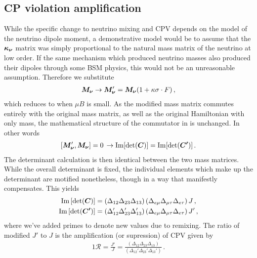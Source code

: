 \subsection{CP violation amplification}\label{sec:amp}
\noindent While the specific change to neutrino mixing and CPV depends on the model of the neutrino dipole moment, a demonstrative model would be to assume that the $\boldsymbol{\kappa_{\nu}}$ matrix was simply proportional to the natural mass matrix of the neutrino at low order. If the same mechanism which produced neutrino masses also produced their dipoles through some BSM physics, this would not be an unreasonable assumption. Therefore we substitute
\begin{alignat}{1}
	\label{simplek:1} \boldsymbol{M_{\nu}}\rightarrow\boldsymbol{M_{\nu}}'=\boldsymbol{M_{\nu}}(1+\kappa\sigma\cdot F)\,,
\end{alignat}
which reduces to  when $\mu B$ is small. As the modified mass matrix commutes entirely with the original mass matrix, as well as the original Hamiltonian with only mass, the mathematical structure of the commutator in  is unchanged. In other words
\begin{alignat}{1}
	\label{commutes:1} \left[\boldsymbol{M_{\nu}}',\boldsymbol{M_{\nu}}\right]=0\, \rightarrow \mathrm{Im}[\mathrm{det}(\boldsymbol{C})] = \mathrm{Im}[\mathrm{det}(\boldsymbol{C'})]\,.
\end{alignat}
The determinant calculation is then identical between the two mass matrices. While the overall determinant is fixed, the individual elements which make up the determinant are motified nonetheless, though in a way that manifestly compensates. This yields
\begin{alignat}{1}
	\label{det:0} \mathrm{Im}\left[\mathrm{det}(\boldsymbol{C})\right] &= \left(\Delta_{12}\Delta_{23}\Delta_{13}\right)\left(\Delta_{e\mu}\Delta_{\mu\tau}\Delta_{e\tau}\right)J\,,\\
	\label{det:2} \mathrm{Im}\left[\mathrm{det}(\boldsymbol{C'})\right] &= \left(\Delta_{12}'\Delta_{23}'\Delta_{13}'\right)\left(\Delta_{e\mu}\Delta_{\mu\tau}\Delta_{e\tau}\right)J'\,,
\end{alignat}
where we've added primes to denote new values due to remixing. The ratio of modified $J'$ to $J$ is the amplification (or supression) of CPV \ar given by
\begin{alignat}{1}
	\label{amp:1} \mathcal{R} = \frac{J'}{J} = \frac{\left(\Delta_{12}\Delta_{23}\Delta_{13}\right)}{\left(\Delta_{12}'\Delta_{23}'\Delta_{13}'\right)}\,.
\end{alignat}

